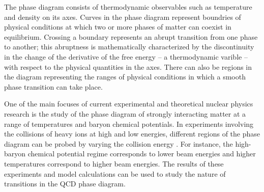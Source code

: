 The phase diagram consists of thermodynamic observables such as temperature and density on its axes. Curves in the phase diagram represent boundries of physical conditions at which two or more phases of matter can coexist in equilibrium. Crossing a boundary represents an abrupt transition from one phase to another; this abruptness is mathematically characterized by the discontinuity in the change of the derivative of the free energy -- a thermodynamic varible -- with respect to the physical quantities in the axes. There can also be regions in the diagram representing the ranges of physical conditions in which a smooth phase transition can take place.

One of the main focuses of current experimental and theoretical nuclear physics research is the study of the phase diagram of strongly interacting matter at a range of temperatures and baryon chemical potentials. In experiments involving the collisions of heavy ions at high and low energies, different regions of the phase diagram can be probed by varying the collision energy \cite{PhysRevC.93.024901}. For instance, the high-baryon chemical potential regime corresponds to lower beam energies and higher temperatures correspond to higher beam energies. The results of these experiments and model calculations can be used to study the nature of transitions in the QCD phase diagram.


